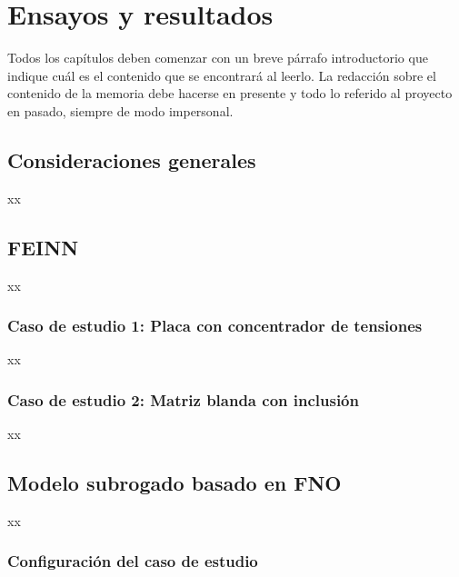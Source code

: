 
\chapter{Ensayos y resultados} %

\label{Chapter4} %
Todos los capítulos deben comenzar con un breve párrafo introductorio que indique cuál es el contenido que se encontrará al leerlo.  La redacción sobre el contenido de la memoria debe hacerse en presente y todo lo referido al proyecto en pasado, siempre de modo impersonal.


\section{Consideraciones generales}

xx

\section{FEINN}

xx

\subsection{Caso de estudio 1: Placa con concentrador de tensiones}

xx

\subsection{Caso de estudio 2: Matriz blanda con inclusión}

xx

\section{Modelo subrogado basado en FNO}

xx

\subsection{Configuración del caso de estudio}


